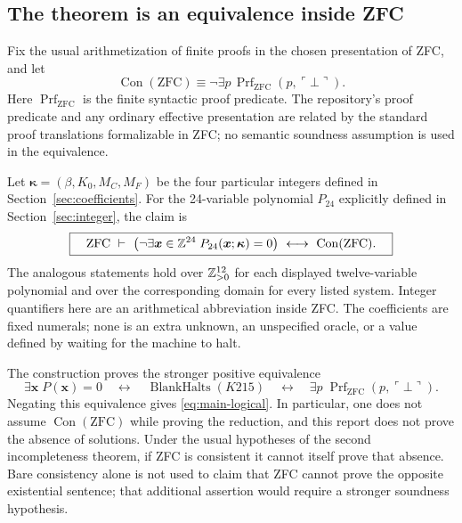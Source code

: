 \subsection{The theorem is an equivalence inside ZFC}

Fix the usual arithmetization of finite proofs in the chosen presentation
of ZFC, and let
\[
 \operatorname{Con}(\mathrm{ZFC})\equiv
 \neg\exists p\,\operatorname{Prf}_{\mathrm{ZFC}}
                         (p,\ulcorner\bot\urcorner).
\]
Here $\operatorname{Prf}_{\mathrm{ZFC}}$ is the finite syntactic proof
predicate.  The repository's proof predicate and any ordinary effective
presentation are related by the standard proof translations formalizable
in ZFC; no semantic soundness assumption is used in the equivalence.

Let $\boldsymbol\kappa=(\beta,K_0,M_C,M_F)$ be the four particular
integers defined in Section~\ref{sec:coefficients}.  For the 24-variable
polynomial $P_{24}$ explicitly defined in Section~\ref{sec:integer},
the claim is
\begin{equation}\label{eq:main-logical}
 \boxed{\quad\mathrm{ZFC}\ \vdash\
 \bigl(\neg\exists\boldsymbol x\in\mathbb Z^{24}\;
       P_{24}(\boldsymbol x;\boldsymbol\kappa)=0\bigr)
 \ \longleftrightarrow\ \operatorname{Con}(\mathrm{ZFC}).\quad}
\end{equation}
The analogous statements hold over $\mathbb Z_{>0}^{12}$ for each displayed
twelve-variable polynomial and over the corresponding domain for every
listed system.  Integer quantifiers here are an arithmetical abbreviation
inside ZFC.  The coefficients are fixed numerals; none is an extra
unknown, an unspecified oracle, or a value defined by waiting for the
machine to halt.

The construction proves the stronger positive equivalence
\begin{equation}\label{eq:existential-chain}
 \exists\boldsymbol x\;P(\boldsymbol x)=0
 \quad\longleftrightarrow\quad
 \operatorname{BlankHalts}(K215)
 \quad\longleftrightarrow\quad
 \exists p\;\operatorname{Prf}_{\mathrm{ZFC}}(p,\ulcorner\bot\urcorner).
\end{equation}
Negating this equivalence gives \eqref{eq:main-logical}.  In particular,
one does not assume $\operatorname{Con}(\mathrm{ZFC})$ while proving the
reduction, and this report does not prove the absence of solutions.
Under the usual hypotheses of the second incompleteness theorem, if ZFC
is consistent it cannot itself prove that absence.  Bare consistency
alone is not used to claim that ZFC cannot prove the opposite existential
sentence; that additional assertion would require a stronger soundness
hypothesis.


